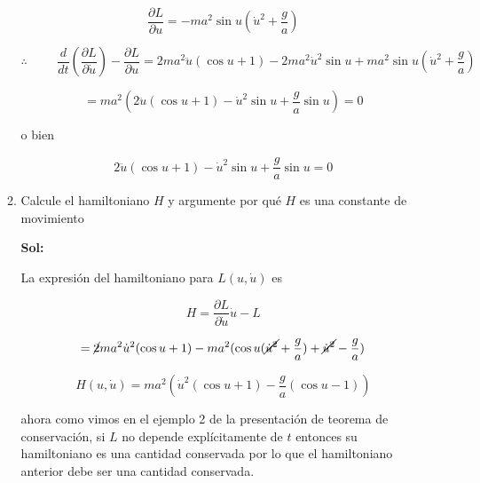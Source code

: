 \documentclass[12pt,a4paper]{article}
\begin{document}
\begin{enumerate}
\begin{enumerate}
    \begin{equation*}
        \frac{\partial L}{\partial u} = - m a^2 \sin{u} (\dot{u}^2 + \frac{g}{a})
    \end{equation*}
    
    \begin{equation*}
        \therefore \hspace{1cm} \frac{d}{dt} \left(\frac{\partial L}{\partial \dot{u}}\right) - \frac{\partial L}{\partial u}  = 2ma^2\ddot{u} (\cos{u} + 1) - 2ma^2 \dot{u}^2 \sin{u}  + m a^2 \sin{u} (\dot{u}^2 + \frac{g}{a})
    \end{equation*}
    
    \begin{equation*}
        =ma^2( 2\ddot{u} (\cos{u} + 1) -  \dot{u}^2 \sin{u}  + \frac{g}{a} \sin{u} ) = 0
    \end{equation*}
    
    o bien
    
    \begin{equation*}
        2\ddot{u} (\cos{u} + 1) -  \dot{u}^2 \sin{u}  + \frac{g}{a} \sin{u}  = 0
    \end{equation*}
    
    \item Calcule el hamiltoniano $H$ y argumente por qué $H$ es una constante de movimiento
    
    \textbf{Sol:}
    
    La expresión del hamiltoniano para $L(u,\dot{u})$ es 
    
    \begin{equation*}
        H = \frac{\partial L}{\partial \dot{u}} \dot{u} - L
    \end{equation*}
    
    \begin{equation*}
        = \cancel{2}ma^2\dot{u}^2 (\cos{u} + 1) - ma^2 (\cos{u} (\cancel{\dot{u}^2 }+ \frac{g}{a}) + \cancel{\dot{u}^2}-\frac{g}{a})
    \end{equation*}
    
    \begin{equation*}
        H(u,\dot{u}) = ma^2(\dot{u}^2 (\cos{u}+1) - \frac{g}{a}(\cos{u} -1))
    \end{equation*}
    
    ahora como vimos en el ejemplo 2 de la presentación de teorema de conservación, si $L$ no depende explícitamente de $t$ entonces su hamiltoniano es una cantidad conservada por lo que el hamiltoniano anterior debe ser una cantidad conservada.
    

\end{enumerate}
\end{enumerate}
\end{document}
